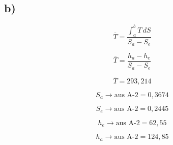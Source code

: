 

\subsection*{b)}

\[
\overline{T} = \frac{\int_{a}^{b} T \, dS}{S_a - S_e}
\]

\[
\overline{T} = \frac{h_a - h_e}{S_a - S_e}
\]

\[
\overline{T} = 293,214
\]

\[
S_a \rightarrow \text{aus A-2} = 0,3674
\]

\[
S_e \rightarrow \text{aus A-2} = 0,2445
\]

\[
h_e \rightarrow \text{aus A-2} = 62,55
\]

\[
h_a \rightarrow \text{aus A-2} = 124,85
\]